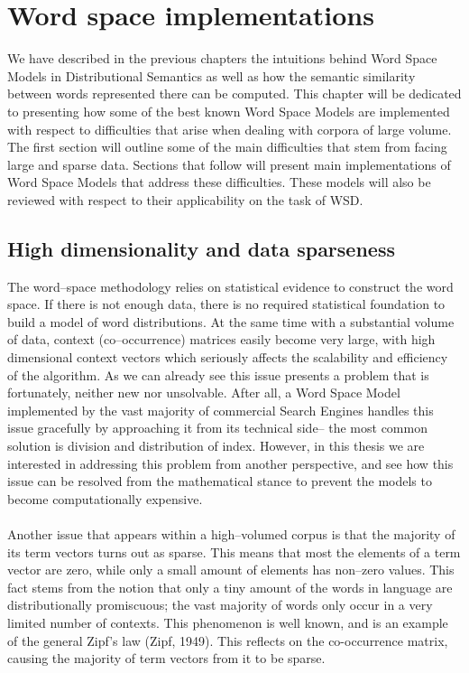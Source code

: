 \chapter{Word space implementations}
We have described in the previous chapters the intuitions behind Word Space Models in Distributional 
Semantics as well as how the semantic similarity between words represented there can be computed. 
This chapter will be dedicated to presenting how some of the best known Word Space Models are 
implemented with respect to difficulties that arise when dealing with corpora of large volume. The first 
section will outline some of the main difficulties that stem from facing large and sparse data. Sections 
that follow will present main implementations of Word Space Models that address these difficulties. 
These models will also be reviewed with respect to their applicability on the task of WSD. 

\section{High dimensionality and data sparseness}
The word--space methodology relies on statistical evidence to construct the word space. If there is not 
enough data, there is no   required statistical foundation to build a model of word distributions. At the 
same time with a substantial volume of data, context (co--occurrence) matrices easily become very 
large, with high dimensional context vectors which seriously affects the scalability and efficiency of the 
algorithm. As we can already see this issue presents a problem that is fortunately, neither new nor 
unsolvable. After all, a Word Space Model implemented by the vast majority of commercial Search 
Engines handles this issue gracefully by approaching it from its technical side-- the most common 
solution is division and distribution of index. However, in this thesis we are interested in addressing 
this problem from another perspective, and see how this issue can be resolved from the mathematical 
stance to prevent the models to become computationally expensive.
\\\\  Another issue that appears within a high--volumed corpus is that the majority of its term vectors 
turns out as sparse. This means that most the elements of a term vector are zero, while only a small 
amount of elements has non--zero values. This fact stems from the notion that only a tiny amount of the 
words in language are distributionally promiscuous; the vast majority of words only occur in a very 
limited number of contexts. This phenomenon is well known, and is an example of the general Zipf's 
law (Zipf, 1949)\cite{zipf1949_1}. This reflects on the co-occurrence matrix, causing the majority of 
term vectors from it to be sparse. 


